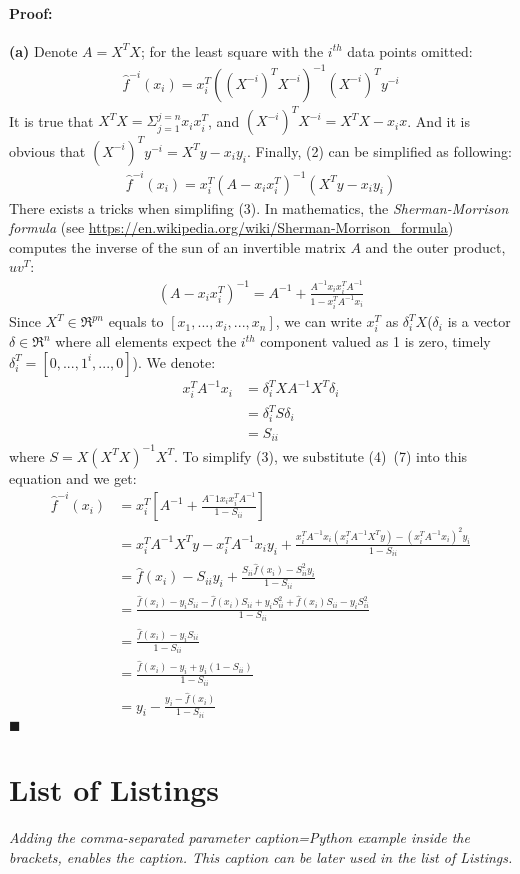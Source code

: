 \documentclass[a4paper, 12pt]{article}
\begin{document}
    \paragraph{\textbf{Proof:}} \textbf{(a)} Denote $A = X^{T}X $; for the least square with the $i^{th}$ data points omitted: 
    \begin{align}%
        \hat{f}^{-i}(x_i) = x_{i}^{T}((X^{-i})^TX^{-i})^{-1}(X^{-i})^Ty^{-i}
    \end{align}
    It is true that $X^TX = \Sigma_{j=1}^{j=n}x_ix^T_i$, and $(X^{-i})^TX^{-i} = X^TX - x_ix$. And it is obvious that $(X^{-i})^Ty^{-i} = 
    X^Ty - x_iy_i$. Finally, (2) can be simplified as following:
    \begin{align}%
        \hat{f}^{-i}(x_i) = x_{i}^{T}(A-x_ix_i^T)^{-1}(X^Ty-x_iy_i)
    \end{align}
    There exists a tricks when simplifing (3). In mathematics, the \emph{Sherman-Morrison formula} 
    (see \url{ https://en.wikipedia.org/wiki/Sherman-Morrison\_formula})
     computes the inverse of the sun of an invertible matrix $A$ and the outer product, $uv^T$:
    \begin{align}%
        (A-x_ix_i^T)^{-1} = A^{-1} + \frac{A^{-1}x_ix_i^TA^{-1}}{1-x_i^TA^{-1}x_i}
    \end{align}
    Since $X^T \in \Re^{pn}$ equals to $[x_1,...,x_i,...,x_n]$, we can write $x^T_i$ as $\delta_i^TX$($\delta_i$ is a vector $\delta \in \Re^n$ where
    all elements expect the $i^{th}$ component valued as 1 is zero, timely $\delta_i^T = [0,...,1^{i},...,0]$). We denote:
    \begin{align}
        x_i^TA^{-1}x_i &= \delta_i^TXA^{-1}X^T\delta_i\\
        &= \delta_i^TS\delta_i\\
        &= S_{ii}
    \end{align}
    where $S = X(X^TX)^{-1}X^T$.
    To simplify (3), we substitute (4)~(7) into this equation and we get:
    \begin{align}
        \hat{f}^{-i}(x_i) &= x_i^T[A^{-1}+\frac{A^-1x_ix_i^TA^{-1}}{1-S_{ii}}]\\
        &= x_i^TA^{-1}X^Ty - x_i^TA^{-1}x_iy_i+\frac{x_i^TA^{-1}x_i(x_i^TA^{-1}X^Ty) - (x_i^TA^{-1}x_i)^2y_i}{1-S_{ii}}\\
        &= \hat{f}(x_i) - S_{ii}y_i + \frac{S_{ii}\hat{f}(x_i)-S_{ii}^2y_i}{1-S_{ii}}\\
        &= \frac{\hat{f}(x_i)- y_iS_{ii} - \hat{f}(x_i)S_{ii} + y_iS^2_{ii}+\hat{f}(x_i)S_{ii}-y_iS^2_{ii}}{1-S_{ii}}\\
        &= \frac{\hat{f}(x_i)-y_iS_{ii}}{1-S_{ii}}\\
        &= \frac{\hat{f}(x_i) - y_i + y_i(1-S_{ii})}{1-S_{ii}}\\
        &= y_i - \frac{y_i - \hat{f}(x_i)}{1-S_{ii}}
    \end{align}
    \hfill $\blacksquare$
	\section*{List of Listings}

	\emph{Adding the comma-separated parameter caption=Python example inside the brackets, enables the caption. This caption can be later used in the list of Listings.}

	\lstlistoflistings
\end{document}
